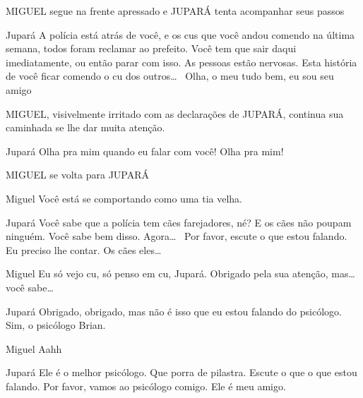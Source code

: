 \documentclass{screenplay}
\begin{document}
MIGUEL segue na frente apressado e JUPARÁ tenta acompanhar seus passos

\begin{dialogue}{Jupará}
    A polícia está atrás de você, e os cus que você andou comendo na última semana, todos foram reclamar ao prefeito.
    Você tem que sair daqui imediatamente, ou então parar com isso. As pessoas estão nervosas.
    Esta história de você ficar comendo o cu dos outros\dots~
    Olha, o meu tudo bem, eu sou seu amigo
\end{dialogue}

MIGUEL, visivelmente irritado com as declarações de JUPARÁ, continua sua caminhada se lhe dar muita atenção.

\begin{dialogue}{Jupará}
    Olha pra mim quando eu falar com você! Olha pra mim!
\end{dialogue}

MIGUEL se volta para JUPARÁ

\begin{dialogue}{Miguel}
    Você está se comportando como uma tia velha.
\end{dialogue}

\begin{dialogue}{Jupará}
    Você sabe que a polícia tem cães farejadores, né? E os cães não poupam ninguém. Você sabe bem disso. Agora\dots~
    Por favor, escute o que estou falando. Eu preciso lhe contar. Os cães eles\dots~
\end{dialogue}

\begin{dialogue}{Miguel}
    Eu só vejo cu, só penso em cu, Jupará.
    Obrigado pela sua atenção, mas\dots~ você sabe\dots
\end{dialogue}

\begin{dialogue}{Jupará}
    Obrigado, obrigado, mas não é isso que eu estou falando do psicólogo.
    Sim, o psicólogo Brian.
\end{dialogue}

\begin{dialogue}[impaciente]{Miguel}
    Aahh
\end{dialogue}

\begin{dialogue}{Jupará}
    Ele é o melhor psicólogo.
    Que porra de pilastra.
    Escute o que o que estou falando. Por favor, vamos ao psicólogo comigo. Ele é meu amigo.
\end{dialogue}
\end{document}
